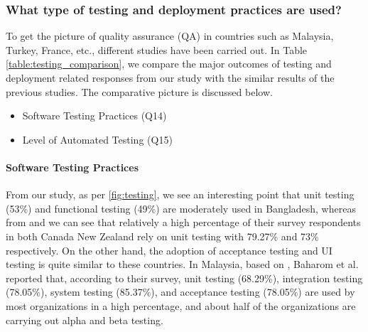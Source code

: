 \subsubsection{What type of testing and deployment practices are used?}

To get the picture of quality assurance (QA) in countries such as Malaysia, Turkey, France, etc., different studies have been carried out. In Table \ref{table:testing_comparison}, we compare the major outcomes of testing and deployment related responses from our study with the similar results of the previous studies. The comparative picture is discussed below.

\begin{itemize}
    \item Software Testing Practices (Q14)
    \item Level of Automated Testing (Q15)
\end{itemize}




\paragraph{Software Testing Practices}
From our study, as per \ref{fig:testing}, we see an interesting point that unit testing (53\%) and functional testing (49\%) are moderately used in Bangladesh, whereas from \citep{Garousi2013} and \citep{Wang2018} we can see that relatively a high percentage of their survey respondents in both Canada New Zealand rely on unit testing with 79.27\% and 73\% respectively. On the other hand, the adoption of acceptance testing and UI testing is quite similar to these countries. In Malaysia, based on \citep{Baharom2006}, Baharom et al. reported that, according to their survey, unit testing (68.29\%), integration testing (78.05\%), system testing (85.37\%), and acceptance testing (78.05\%) are used by most organizations in a high percentage, and about half of the organizations are carrying out alpha and beta testing.


